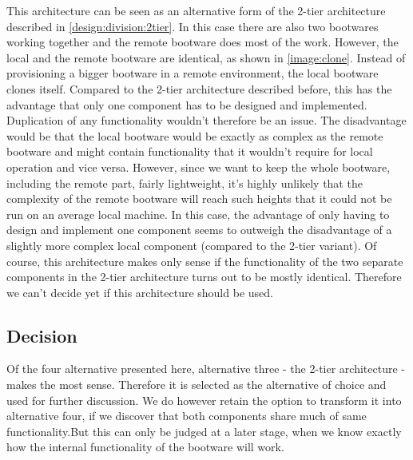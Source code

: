 This architecture can be seen as an alternative form of the 2-tier architecture described in \autoref{design:division:2tier}.
In this case there are also two bootwares working together and the remote bootware does most of the work.
However, the local and the remote bootware are identical, as shown in \autoref{image:clone}.
Instead of provisioning a bigger bootware in a remote environment, the local bootware clones itself.
Compared to the 2-tier architecture described before, this has the advantage that only one component has to be designed and implemented.
Duplication of any functionality wouldn't therefore be an issue.
The disadvantage would be that the local bootware would be exactly as complex as the remote bootware and might contain functionality that it wouldn't require for local operation and vice versa.
However, since we want to keep the whole bootware, including the remote part, fairly lightweight, it's highly unlikely that the complexity of the remote bootware will reach such heights that it could not be run on an average local machine.
In this case, the advantage of only having to design and implement one component seems to outweigh the disadvantage of a slightly more complex local component (compared to the 2-tier variant).
Of course, this architecture makes only sense if the functionality of the two separate components in the 2-tier architecture turns out to be mostly identical.
Therefore we can't decide yet if this architecture should be used.

\subsection{Decision}

Of the four alternative presented here, alternative three - the 2-tier architecture - makes the most sense.
Therefore it is selected as the alternative of choice and used for further discussion.
We do however retain the option to transform it into alternative four, if we discover that both components share much of same functionality.But this can only be judged at a later stage, when we know exactly how the internal functionality of the bootware will work.
